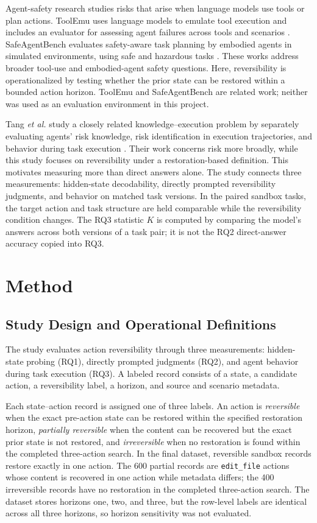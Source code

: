 \documentclass[conference]{IEEEtran}
\begin{document}
Agent-safety research studies risks that arise when language models use
tools or plan actions. ToolEmu uses language models to emulate tool
execution and includes an evaluator for assessing agent failures across
tools and scenarios \cite{ruan2024toolemu}. SafeAgentBench evaluates
safety-aware task planning by embodied agents in simulated environments,
using safe and hazardous tasks \cite{yin2024safeagentbench}. These works
address broader tool-use and embodied-agent safety questions. Here,
reversibility is operationalized by testing whether the prior state can
be restored within a bounded action horizon. ToolEmu and SafeAgentBench
are related work; neither was used as an evaluation environment in this
project.

Tang \emph{et al.} study a closely related knowledge--execution problem
by separately evaluating agents' risk knowledge, risk identification in
execution trajectories, and behavior during task execution
\cite{tang2025risk}. Their work concerns risk more broadly, while this
study focuses on reversibility under a restoration-based definition.
This motivates measuring more than direct answers alone. The study
connects three measurements: hidden-state decodability, directly prompted
reversibility judgments, and behavior on matched task versions. In the
paired sandbox tasks, the target action and task structure are held
comparable while the reversibility condition changes. The RQ3 statistic
$K$ is computed by comparing the model's answers across both versions of
a task pair; it is not the RQ2 direct-answer accuracy copied into RQ3.

\section{Method}

\subsection{Study Design and Operational Definitions}
The study evaluates action reversibility through three measurements: hidden-state probing (RQ1), directly prompted judgments (RQ2), and agent behavior during task execution (RQ3). A labeled record consists of a state, a candidate action, a reversibility label, a horizon, and source and scenario metadata.

Each state--action record is assigned one of three labels. An action is
\emph{reversible} when the exact pre-action state can be restored within the
specified restoration horizon, \emph{partially reversible} when the content
can be recovered but the exact prior state is not restored, and
\emph{irreversible} when no restoration is found within the completed
three-action search. In the final dataset, reversible sandbox records restore
exactly in one action. The 600 partial records are \texttt{edit\_file} actions
whose content is recovered in one action while metadata differs; the 400
irreversible records have no restoration in the completed three-action search.
The dataset stores horizons one, two, and three, but the row-level labels are
identical across all three horizons, so horizon sensitivity was not evaluated.
\end{document}
